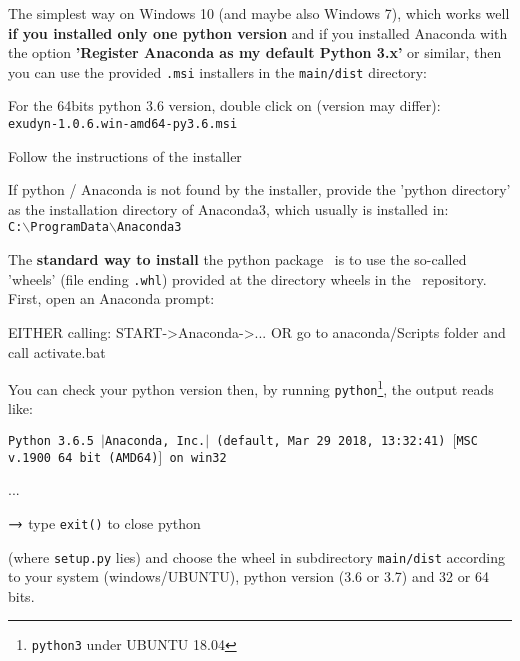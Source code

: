The simplest way on Windows 10 (and maybe also Windows 7), which works well {\bf if you installed only one python version} and if you installed Anaconda with the option {\bf 'Register Anaconda as my default Python 3.x'} or similar, then you can use the provided \texttt{.msi} installers in the \texttt{main/dist} directory:
\bi
  \item For the 64bits python 3.6 version, double click on (version may differ):\\ \texttt{exudyn-1.0.6.win-amd64-py3.6.msi}
	\item Follow the instructions of the installer
	\item If python / Anaconda is not found by the installer, provide the 'python directory' as the installation directory of Anaconda3, which usually is installed in:\\
	\texttt{C:$\backslash$ProgramData$\backslash$Anaconda3}
\ei

The {\bf standard way to install} the python package \codeName\ is to use the so-called 'wheels' (file ending \texttt{.whl}) provided at the directory wheels in the \codeName\ repository. 
First, open an Anaconda prompt:
\bi
  \item EITHER calling: START->Anaconda->... OR go to anaconda/Scripts folder and call activate.bat
	\item You can check your python version then, by running \texttt{python}\footnote{\texttt{python3} under UBUNTU 18.04}, the output reads like:
	\bi
	  \item[] \texttt{Python 3.6.5 $|$Anaconda, Inc.$|$ (default, Mar 29 2018, 13:32:41) $[$MSC v.1900 64 bit (AMD64)$]$ on win32}
		\item[] ...
	\ei
	\item $\rightarrow$ type \texttt{exit()} to close python
\ei

 (where \texttt{setup.py} lies) and choose the wheel in subdirectory \texttt{main/dist} according to your system (windows/UBUNTU), python version (3.6 or 3.7) and 32 or 64 bits.

